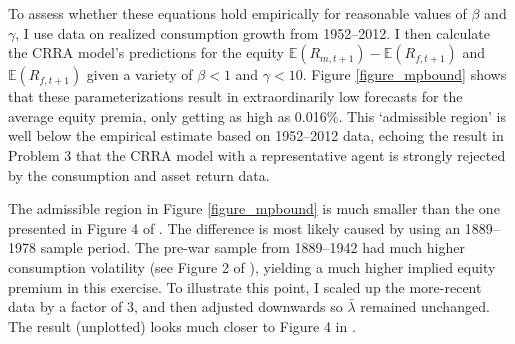 \documentclass[12pt]{article}
\newcommand{\E}{\mathbb{E}}
\begin{document}
To assess whether these equations hold empirically for reasonable values of $\beta$ and $\gamma$, I use data on realized consumption growth from 1952--2012. I then calculate the CRRA model's predictions for the equity $\E ( R_{m,t+1} ) - \E ( R_{f,t+1} )$ and $\E ( R_{f,t+1} )$ given a variety of $\beta < 1$ and $\gamma < 10$. Figure \ref{figure_mpbound} shows that these parameterizations result in extraordinarily low forecasts for the average equity premia, only getting as high as 0.016\%. This `admissible region' is well below the empirical estimate based on 1952--2012 data, echoing the result in Problem 3 that the CRRA model with a representative agent is strongly rejected by the consumption and asset return data.

The admissible region in Figure \ref{figure_mpbound} is much smaller than the one presented in Figure 4 of \cite{mehra1985equity}. The difference is most likely caused by \cite{mehra1985equity} using an 1889--1978 sample period. The pre-war sample from 1889--1942 had much higher consumption volatility (see Figure 2 of \cite{mehra1985equity}), yielding a much higher implied equity premium in this exercise. To illustrate this point, I scaled up the more-recent data by a factor of 3, and then adjusted downwards so $\bar{\lambda}$ remained unchanged. The result (unplotted) looks much closer to Figure 4 in \cite{mehra1985equity}.



\end{document}
